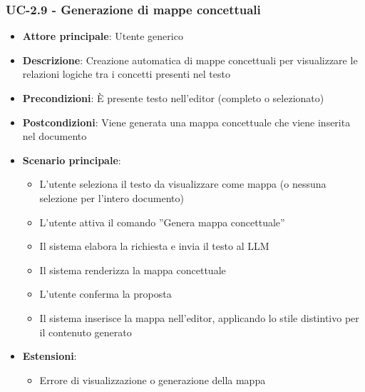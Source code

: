 \documentclass[11pt,a4paper]{article}
\begin{document}
\subsubsection{UC-2.9 - Generazione di mappe concettuali}
\begin{itemize}
    \item \textbf{Attore principale}: Utente generico
    \item \textbf{Descrizione}: Creazione automatica di mappe concettuali per visualizzare le relazioni logiche tra i concetti presenti nel testo
    \item \textbf{Precondizioni}: È presente testo nell’editor (completo o selezionato)
    \item \textbf{Postcondizioni}: Viene generata una mappa concettuale che viene inserita nel documento
    \item \textbf{Scenario principale}:
    \begin{itemize}
        \item L’utente seleziona il testo da visualizzare come mappa (o nessuna selezione per l'intero documento)
        \item L’utente attiva il comando ”Genera mappa concettuale”
        \item Il sistema elabora la richiesta e invia il testo al LLM
        \item Il sistema renderizza la mappa concettuale
        \item L'utente conferma la proposta 
        \item Il sistema inserisce la mappa nell'editor, applicando lo stile distintivo per il contenuto generato
    \end{itemize}
    \item \textbf{Estensioni}:
    \begin{itemize}
        \item Errore di visualizzazione o generazione della mappa
    \end{itemize}
\end{itemize}
\end{document}
